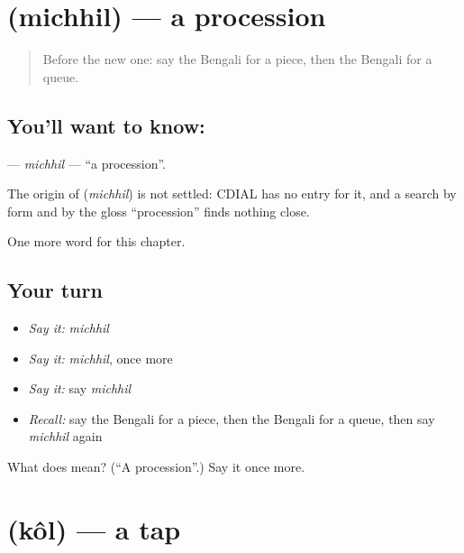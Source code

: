 \section[\texorpdfstring{\bn{মিছিল} (michhil)}{মিছিল (michhil)}]{ (michhil) — a procession}

\label{lesson:BN-C170-michhil}



\begin{quote}
Before the new one: say the Bengali for a piece, then the Bengali for a queue.
\end{quote}

\subsection*{You'll want to know: }
\textbf{} — \emph{michhil} — \textquotedblleft{}a procession\textquotedblright{}.

\begin{cousinweb}
The origin of \textbf{} (\emph{michhil}) is not settled: CDIAL has no entry for it, and a search by form and by the gloss \textquotedblleft{}procession\textquotedblright{} finds nothing close.
\end{cousinweb}

\begin{grammarlens}[title={What you've built}]
One more word for this chapter.
\end{grammarlens}

\subsection*{Your turn}
\begin{itemize}
\raggedright
  \item \emph{Say it:} \emph{michhil}
  \item \emph{Say it:} \emph{michhil}, once more
  \item \emph{Say it:} say \emph{michhil}
  \item \emph{Recall:} say the Bengali for a piece, then the Bengali for a queue, then say \emph{michhil} again
\end{itemize}

\begin{tcolorbox}[breakable,colback=teal!4,colframe=teal!35!black,title={Before you move on}]
What does  mean? (\textquotedblleft{}A procession\textquotedblright{}.) Say it once more.
\end{tcolorbox}
\section[\texorpdfstring{\bn{কল} (kôl)}{কল (kôl)}]{ (kôl) — a tap}

